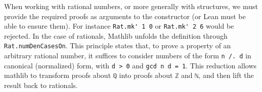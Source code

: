 When working with rational numbers, or more generally with structures, we must provide the 
required proofs as arguments to the constructor (or Lean must be able to ensure them).
For instance \lstinline[language=lean]|Rat.mk' 1 0| or \lstinline[language=lean]|Rat.mk' 2 6| 
would be rejected.
In the case of rationals, Mathlib unfolds the definition through
\lstinline[language=lean]|Rat.numDenCasesOn|. This principle states that, to prove a property of an 
arbitrary rational number, it suffices to consider numbers of the form \lstinline[language=lean]|n /. d| 
in canonical (normalized) form, with \lstinline[language=lean]|d > 0| and \lstinline[language=lean]|gcd n d = 1|.
This reduction allows mathlib to transform proofs about \lstinline[language=lean]|ℚ| 
into proofs about \lstinline[language=lean]|ℤ| and \lstinline[language=lean]|ℕ|, 
and then lift the result back to rationals.
